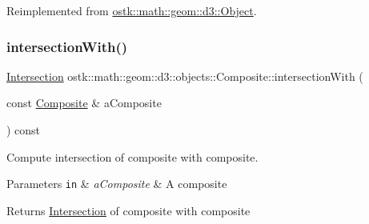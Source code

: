 Reimplemented from \hyperlink{classostk_1_1math_1_1geom_1_1d3_1_1_object_a04622921234740473c7731fa6c5bad0a}{ostk\+::math\+::geom\+::d3\+::\+Object}.

\mbox{\label{classostk_1_1math_1_1geom_1_1d3_1_1objects_1_1_composite_a4f5650ad091ee2009dd7b4cd135993bf}} 
\subsubsection{\texorpdfstring{intersection\+With()}{intersectionWith()}\hspace{0.1cm}{\footnotesize\ttfamily [2/2]}}
{\footnotesize\ttfamily \hyperlink{classostk_1_1math_1_1geom_1_1d3_1_1_intersection}{Intersection} ostk\+::math\+::geom\+::d3\+::objects\+::\+Composite\+::intersection\+With (\begin{DoxyParamCaption}\item[{const \hyperlink{classostk_1_1math_1_1geom_1_1d3_1_1objects_1_1_composite}{Composite} \&}]{a\+Composite }\end{DoxyParamCaption}) const}



Compute intersection of composite with composite. 


\begin{DoxyParams}[1]{Parameters}
\mbox{\tt in}  & {\em a\+Composite} & A composite \\
\hline
\end{DoxyParams}
\begin{DoxyReturn}{Returns}
\hyperlink{classostk_1_1math_1_1geom_1_1d3_1_1_intersection}{Intersection} of composite with composite 
\end{DoxyReturn}
\mbox{\label{classostk_1_1math_1_1geom_1_1d3_1_1objects_1_1_composite_a1064214841e9cc22475e0683fb16bce7}} 
